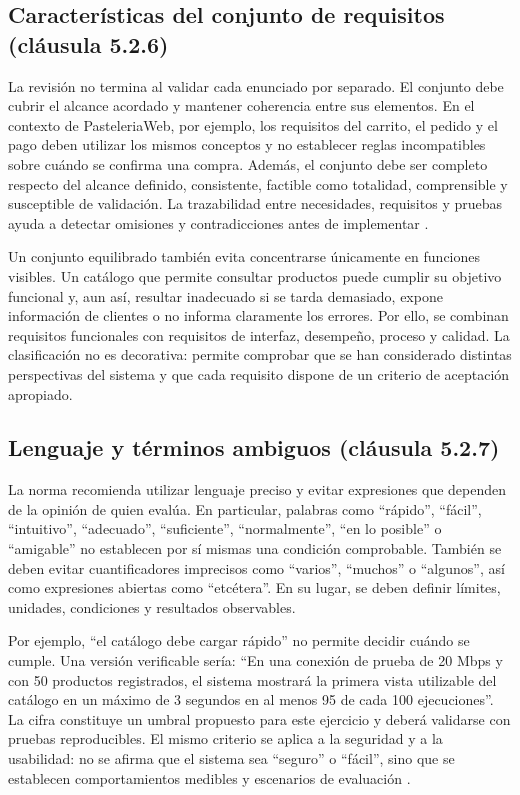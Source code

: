 \documentclass[11pt,a4paper]{article}
\begin{document}
\subsection{Características del conjunto de requisitos (cláusula 5.2.6)}
La revisión no termina al validar cada enunciado por separado. El conjunto debe cubrir el alcance acordado y mantener coherencia entre sus elementos. En el contexto de PasteleriaWeb, por ejemplo, los requisitos del carrito, el pedido y el pago deben utilizar los mismos conceptos y no establecer reglas incompatibles sobre cuándo se confirma una compra. Además, el conjunto debe ser completo respecto del alcance definido, consistente, factible como totalidad, comprensible y susceptible de validación. La trazabilidad entre necesidades, requisitos y pruebas ayuda a detectar omisiones y contradicciones antes de implementar \cite{iso29148,swebok4}.

Un conjunto equilibrado también evita concentrarse únicamente en funciones visibles. Un catálogo que permite consultar productos puede cumplir su objetivo funcional y, aun así, resultar inadecuado si se tarda demasiado, expone información de clientes o no informa claramente los errores. Por ello, se combinan requisitos funcionales con requisitos de interfaz, desempeño, proceso y calidad. La clasificación no es decorativa: permite comprobar que se han considerado distintas perspectivas del sistema y que cada requisito dispone de un criterio de aceptación apropiado.

\subsection{Lenguaje y términos ambiguos (cláusula 5.2.7)}
La norma recomienda utilizar lenguaje preciso y evitar expresiones que dependen de la opinión de quien evalúa. En particular, palabras como “rápido”, “fácil”, “intuitivo”, “adecuado”, “suficiente”, “normalmente”, “en lo posible” o “amigable” no establecen por sí mismas una condición comprobable. También se deben evitar cuantificadores imprecisos como “varios”, “muchos” o “algunos”, así como expresiones abiertas como “etcétera”. En su lugar, se deben definir límites, unidades, condiciones y resultados observables.

Por ejemplo, “el catálogo debe cargar rápido” no permite decidir cuándo se cumple. Una versión verificable sería: “En una conexión de prueba de 20 Mbps y con 50 productos registrados, el sistema mostrará la primera vista utilizable del catálogo en un máximo de 3 segundos en al menos 95 de cada 100 ejecuciones”. La cifra constituye un umbral propuesto para este ejercicio y deberá validarse con pruebas reproducibles. El mismo criterio se aplica a la seguridad y a la usabilidad: no se afirma que el sistema sea “seguro” o “fácil”, sino que se establecen comportamientos medibles y escenarios de evaluación \cite{iso29148,iso25010}.
\end{document}
